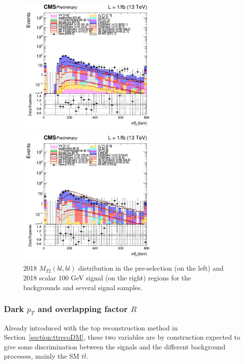 \documentclass[a4paper, 10pt, openright]{report}
\begin{document}
\begin{figure}[htbp]
\centering
\begin{minipage}[b]{.48\textwidth}
\includegraphics[width=7cm, height=7cm]{figs/2018/log_cratio_topCR_ll_mt2bl.png}
\end{minipage}\hfill
\begin{minipage}[b]{.48\textwidth}
\includegraphics[width=7cm, height=7cm]{figs/2018/log_cratio_topCR_ll_DNN_signal0_scalar100_mt2bl.png}
\end{minipage} \hfill
\caption{2018 $M_{T2}(bl, bl)$ distribution in the pre-selection (on the left) and 2018 scalar 100 GeV signal (on the right) regions for the backgrounds and several signal samples.}
\label{fig:SRdiscMT2bl}
\end{figure}

\subsubsection*{Dark $p_T$ and overlapping factor $R$}

Already introduced with the top reconstruction method in Section~\ref{section:ttrecoDM}, these two variables are by construction expected to give some discrimination between the signals and the different background processes, mainly the \ac{SM} $t \bar t$. 
\end{document}

